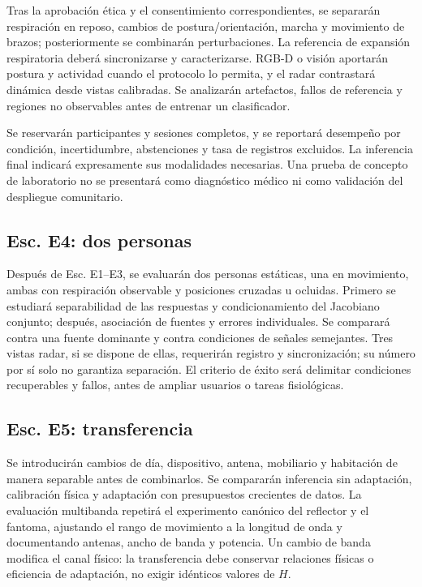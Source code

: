 Tras la aprobación ética y el consentimiento correspondientes, se separarán respiración
en reposo, cambios de postura/orientación, marcha y movimiento de brazos; posteriormente
se combinarán perturbaciones. La referencia de expansión respiratoria deberá sincronizarse
y caracterizarse. RGB-D o visión aportarán postura y actividad cuando el protocolo lo
permita, y el radar contrastará dinámica desde vistas calibradas. Se analizarán artefactos,
fallos de referencia y regiones no observables antes de entrenar un clasificador.

Se reservarán participantes y sesiones completos, y se reportará desempeño por condición,
incertidumbre, abstenciones y tasa de registros excluidos. La inferencia final indicará
expresamente sus modalidades necesarias. Una prueba de concepto de laboratorio no
se presentará como diagnóstico médico ni como validación del despliegue comunitario.

\subsection{Esc. E4: dos personas}

Después de Esc. E1--E3, se evaluarán dos personas estáticas, una en movimiento,
ambas con respiración observable y posiciones cruzadas u ocluidas. Primero se estudiará
separabilidad de las respuestas y condicionamiento del Jacobiano conjunto; después,
asociación de fuentes y errores individuales. Se comparará contra una fuente dominante
y contra condiciones de señales semejantes. Tres vistas radar, si se dispone de ellas,
requerirán registro y sincronización; su número por sí solo no garantiza separación.
El criterio de éxito será delimitar condiciones recuperables y fallos, antes de ampliar
usuarios o tareas fisiológicas.

\subsection{Esc. E5: transferencia}

Se introducirán cambios de día, dispositivo, antena, mobiliario y habitación de manera
separable antes de combinarlos. Se compararán inferencia sin adaptación, calibración
física y adaptación con presupuestos crecientes de datos. La evaluación multibanda
repetirá el experimento canónico del reflector y el fantoma, ajustando el rango de
movimiento a la longitud de onda y documentando antenas, ancho de banda y potencia.
Un cambio de banda modifica el canal físico: la transferencia debe conservar relaciones
físicas o eficiencia de adaptación, no exigir idénticos valores de $H$.

